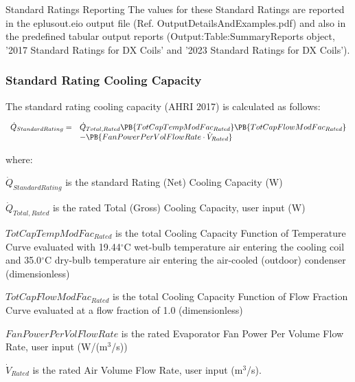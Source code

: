 Standard Ratings Reporting
The values for these Standard Ratings are reported in the eplusout.eio output file (Ref. OutputDetailsAndExamples.pdf) and also in the predefined tabular output reports (Output:Table:SummaryReports object, '2017 Standard Ratings for DX Coils' and '2023 Standard Ratings for DX Coils').

\subsubsection{Standard Rating Cooling Capacity}

The standard rating cooling capacity (AHRI 2017) is calculated as follows:

\begin{equation}
\begin{array}{rl}
\dot{Q}_{StandardRating} =& \dot{Q}_{Total,Rated}\PB{TotCapTempModFac_{Rated}}\PB{TotCapFlowModFac_{Rated}} \\
 & - \PB{FanPowerPerVolFlowRate \cdot \dot{V}_{Rated}}
\end{array}
\end{equation}

where:

\({\dot Q_{StandardRating}}\) is the standard Rating (Net) Cooling Capacity (W)

\({\dot Q_{Total,Rated}}\) is the rated Total (Gross) Cooling Capacity, user input (W)

\(TotCapTempModFa{c_{Rated}}\) is the total Cooling Capacity Function of Temperature Curve evaluated with 19.44\(^{\circ}\)C wet-bulb temperature air entering the cooling coil and 35.0\(^{\circ}\)C dry-bulb temperature air entering the air-cooled (outdoor) condenser (dimensionless)

\(TotCapFlowModFa{c_{Rated}}\) is the total Cooling Capacity Function of Flow Fraction Curve evaluated at a flow fraction of 1.0 (dimensionless)

\(FanPowerPerVolFlowRate\) is the rated Evaporator Fan Power Per Volume Flow Rate, user input (W/(m\(^{3}\)/s))

\({\dot V_{Rated}}\) is the rated Air Volume Flow Rate, user input (m\(^{3}\)/s).

